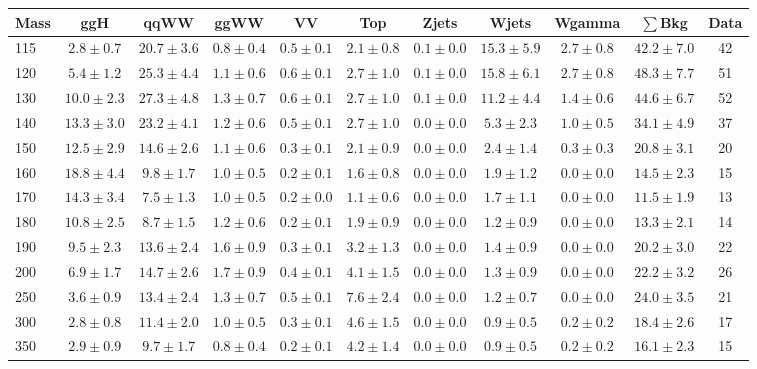 \begin{table}
{\scriptsize
 \begin{center}
 \begin{tabular}{l c c c c c c c c c c }
 \hline
 Mass & ggH & qqWW & ggWW & VV & Top & Zjets & Wjets & Wgamma & $\sum$Bkg & Data \\
 \hline
115 & $2.8\pm0.7$ & $20.7\pm3.6$ & $0.8\pm0.4$ & $0.5\pm0.1$ & $2.1\pm0.8$ & $0.1\pm0.0$ & $15.3\pm5.9$ & $2.7\pm0.8$ & $42.2\pm7.0$ & 42 \\
120 & $5.4\pm1.2$ & $25.3\pm4.4$ & $1.1\pm0.6$ & $0.6\pm0.1$ & $2.7\pm1.0$ & $0.1\pm0.0$ & $15.8\pm6.1$ & $2.7\pm0.8$ & $48.3\pm7.7$ & 51 \\
130 & $10.0\pm2.3$ & $27.3\pm4.8$ & $1.3\pm0.7$ & $0.6\pm0.1$ & $2.7\pm1.0$ & $0.1\pm0.0$ & $11.2\pm4.4$ & $1.4\pm0.6$ & $44.6\pm6.7$ & 52 \\
140 & $13.3\pm3.0$ & $23.2\pm4.1$ & $1.2\pm0.6$ & $0.5\pm0.1$ & $2.7\pm1.0$ & $0.0\pm0.0$ & $5.3\pm2.3$ & $1.0\pm0.5$ & $34.1\pm4.9$ & 37 \\
150 & $12.5\pm2.9$ & $14.6\pm2.6$ & $1.1\pm0.6$ & $0.3\pm0.1$ & $2.1\pm0.9$ & $0.0\pm0.0$ & $2.4\pm1.4$ & $0.3\pm0.3$ & $20.8\pm3.1$ & 20 \\
160 & $18.8\pm4.4$ & $9.8\pm1.7$ & $1.0\pm0.5$ & $0.2\pm0.1$ & $1.6\pm0.8$ & $0.0\pm0.0$ & $1.9\pm1.2$ & $0.0\pm0.0$ & $14.5\pm2.3$ & 15 \\
170 & $14.3\pm3.4$ & $7.5\pm1.3$ & $1.0\pm0.5$ & $0.2\pm0.0$ & $1.1\pm0.6$ & $0.0\pm0.0$ & $1.7\pm1.1$ & $0.0\pm0.0$ & $11.5\pm1.9$ & 13 \\
180 & $10.8\pm2.5$ & $8.7\pm1.5$ & $1.2\pm0.6$ & $0.2\pm0.1$ & $1.9\pm0.9$ & $0.0\pm0.0$ & $1.2\pm0.9$ & $0.0\pm0.0$ & $13.3\pm2.1$ & 14 \\
190 & $9.5\pm2.3$ & $13.6\pm2.4$ & $1.6\pm0.9$ & $0.3\pm0.1$ & $3.2\pm1.3$ & $0.0\pm0.0$ & $1.4\pm0.9$ & $0.0\pm0.0$ & $20.2\pm3.0$ & 22 \\
200 & $6.9\pm1.7$ & $14.7\pm2.6$ & $1.7\pm0.9$ & $0.4\pm0.1$ & $4.1\pm1.5$ & $0.0\pm0.0$ & $1.3\pm0.9$ & $0.0\pm0.0$ & $22.2\pm3.2$ & 26 \\
250 & $3.6\pm0.9$ & $13.4\pm2.4$ & $1.3\pm0.7$ & $0.5\pm0.1$ & $7.6\pm2.4$ & $0.0\pm0.0$ & $1.2\pm0.7$ & $0.0\pm0.0$ & $24.0\pm3.5$ & 21 \\
300 & $2.8\pm0.8$ & $11.4\pm2.0$ & $1.0\pm0.5$ & $0.3\pm0.1$ & $4.6\pm1.5$ & $0.0\pm0.0$ & $0.9\pm0.5$ & $0.2\pm0.2$ & $18.4\pm2.6$ & 17 \\
350 & $2.9\pm0.9$ & $9.7\pm1.7$ & $0.8\pm0.4$ & $0.2\pm0.1$ & $4.2\pm1.4$ & $0.0\pm0.0$ & $0.9\pm0.5$ & $0.2\pm0.2$ & $16.1\pm2.3$ & 15 \\

\end{tabular}
\end{center}}
\end{table}
